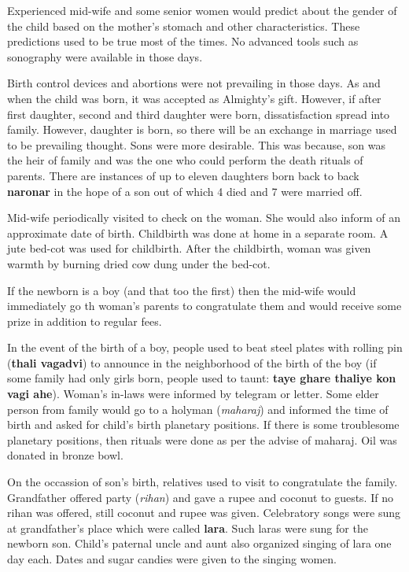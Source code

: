 Experienced mid-wife and some senior women would predict about the gender of the
child based on the mother's stomach and other characteristics. These
predictions used to be true most of the times. No advanced tools such as
sonography were available in those days.

Birth control devices and abortions were not prevailing in those days. As and
when the child was born, it was accepted as Almighty's gift. However, if after
first daughter, second and third daughter were born, dissatisfaction spread
into family. However, daughter is born, so there will be an exchange in
marriage used to be prevailing thought. Sons were more desirable. This was
because, son was the heir of family and was the one who could perform the death
rituals of parents. There are instances of up to eleven daughters born back to
back \textbf{naronar} in the hope of a son out of which 4 died and 7 were married off.

Mid-wife periodically visited to check on the woman. She would also inform of an
approximate date of birth. Childbirth was done at home in a separate room. A
jute bed-cot was used for childbirth. After the childbirth, woman was given
warmth by burning dried cow dung under the bed-cot.

If the newborn is a boy (and that too the first) then the mid-wife would
immediately go th woman's parents to congratulate them and would receive some
prize in addition to regular fees.

In the event of the birth of a boy, people used to beat steel plates with
rolling pin (\textbf{thali vagadvi}) to announce in the neighborhood of the
birth of the boy (if some family had only girls born, people used to taunt:
\textbf{taye ghare thaliye kon vagi ahe}). Woman's in-laws were informed by
telegram or letter. Some elder person from family would go to a holyman
(\textit{maharaj}) and informed the time of birth and asked for child's birth
planetary positions. If there is some troublesome planetary positions, then
rituals were done as per the advise of maharaj. Oil was donated in bronze bowl.

On the occassion of son's birth, relatives used to visit to congratulate the
family. Grandfather offered party (\textit{rihan}) and gave a rupee and coconut
to guests. If no rihan was offered, still coconut and rupee was given.
Celebratory songs were sung at grandfather's place which were called
\textbf{lara}. Such laras were sung for the newborn son. Child's paternal uncle
and aunt also organized singing of lara one day each. Dates and sugar candies
were given to the singing women.

